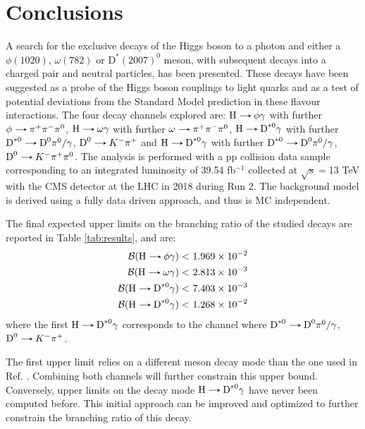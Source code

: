 \chapter*{Conclusions}\label{chap:conclusions}

A search for the exclusive decays of the Higgs boson to a photon and either a $\phi(1020)$, $\omega(782)$ or $\text{D}^{*}(2007)^{0}$ meson, with subsequent decays into a charged pair and neutral particles, has been presented. These decays have been suggested as a probe of the Higgs boson couplings to light quarks and as a test of potential deviations from the Standard Model prediction in these flavour interactions. The four decay channels explored are: $\text{H}\decaysto \phi\gamma$ with further $\phi\decaysto \pi^+\pi^-\pi^0$, $\text{H}\decaysto \omega\gamma$ with further $\omega\decaysto \pi^+\pi^-\pi^0$, $\text{H}\decaysto \text{D}^{*0}\gamma$ with further $\text{D}^{*0}\decaysto \text{D}^{0}\pi^{0}/\gamma$, $\text{D}^{0}\decaysto K^{-}\pi^{+}$ and $\text{H}\decaysto \text{D}^{*0}\gamma$ with further $\text{D}^{*0}\decaysto \text{D}^{0}\pi^{0}/\gamma$, $\text{D}^{0}\decaysto K^{-}\pi^{+}\pi^{0}$. The analysis is performed with a pp collision data sample corresponding to an integrated luminosity of 39.54 fb$^{-1}$ collected at $\sqrt{s}=$13 TeV with the CMS detector at the LHC in 2018 during Run 2. The background model is derived using a fully data driven approach, and thus is MC independent.

The final expected upper limits on the branching ratio of the studied decays are reported in Table \ref{tab:results}, and are:
\begin{equation*}
    \begin{aligned}
        \mathcal{B}(\text{H}\decaysto \phi\gamma) <&\ 1.969 \times 10^{-2}\\
        \mathcal{B}(\text{H}\decaysto \omega\gamma) <&\ 2.813 \times 10^{-3}\\
        \mathcal{B}(\text{H}\decaysto\text{D}^{*0}\gamma) <&\ 7.403 \times 10^{-3}\\
        \mathcal{B}(\text{H}\decaysto\text{D}^{*0}\gamma) <&\ 1.268 \times 10^{-2}\\
\end{aligned}
\end{equation*}
where the first $\text{H}\decaysto\text{D}^{*0}\gamma$ corresponds to the channel where $\text{D}^{*0}\decaysto \text{D}^{0}\pi^{0}/\gamma$, $\text{D}^{0}\decaysto K^{-}\pi^{+}$.

The first upper limit relies on a different meson decay mode than the one used in Ref. \cite{ATLAS:2017gko}. Combining both channels will further constrain this upper bound. Conversely, upper limits on the decay mode $\text{H}\decaysto\text{D}^{*0}\gamma$ have never been computed before. This initial approach can be improved and optimized to further constrain the branching ratio of this decay.

